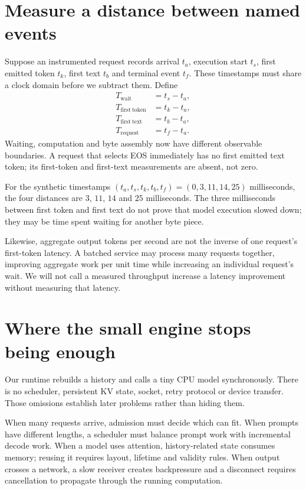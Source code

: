 \section{Measure a distance between named events}
Suppose an instrumented request records arrival $t_a$, execution start $t_s$,
first emitted token $t_k$, first text $t_b$ and terminal event $t_f$. These
timestamps must share a clock domain before we subtract them. Define
\begin{align}
T_{\mathrm{wait}}&=t_s-t_a,\\
T_{\mathrm{first\ token}}&=t_k-t_a,\\
T_{\mathrm{first\ text}}&=t_b-t_a,\\
T_{\mathrm{request}}&=t_f-t_a.
\end{align}
Waiting, computation and byte assembly now have different observable
boundaries. A request that selects EOS immediately has no first emitted text
token; its first-token and first-text measurements are absent, not zero.


For the synthetic timestamps $(t_a,t_s,t_k,t_b,t_f)=(0,3,11,14,25)$ milliseconds,
the four distances are $3$, $11$, $14$ and $25$ milliseconds. The three
milliseconds between first token and first text do not prove that model
execution slowed down; they may be time spent waiting for another byte piece.

Likewise, aggregate output tokens per second are not the inverse of one
request's first-token latency. A batched service may process many requests
together, improving aggregate work per unit time while increasing an
individual request's wait. We will not call a measured throughput increase a
latency improvement without measuring that latency.

\section{Where the small engine stops being enough}
Our runtime rebuilds a history and calls a tiny CPU model synchronously.
There is no scheduler, persistent KV state, socket, retry protocol or device
transfer. Those omissions establish later problems rather than hiding them.

When many requests arrive, admission must decide which can fit. When prompts
have different lengths, a scheduler must balance prompt work with incremental
decode work. When a model uses attention, history-related state consumes
memory; reusing it requires layout, lifetime and validity rules. When output
crosses a network, a slow receiver creates backpressure and a disconnect
requires cancellation to propagate through the running computation.

